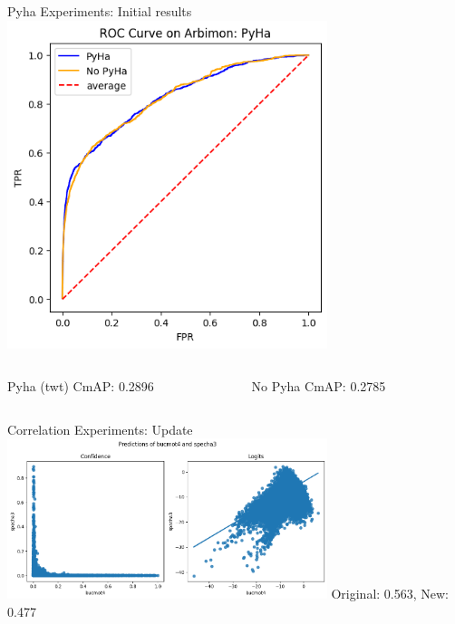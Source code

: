 \begin{frame}{Pyha Experiments: Initial results}
    \centering
    \includegraphics[height=0.7\textheight,width=0.7\textwidth,keepaspectratio]{images/arbimon_ROC.png}
    \begin{columns}
        \begin{column}{0.5\textwidth}
            Pyha (twt) CmAP: 0.2896
        \end{column}
        \begin{column}{0.5\textwidth}
            No Pyha CmAP: 0.2785
        \end{column}
    \end{columns}
\end{frame}

\begin{frame}{Correlation Experiments: Update}
    \centering
    \includegraphics[height=0.7\textheight,width=0.7\textwidth,keepaspectratio]{images/bucmot_specha.png}
    \break
    Original: 0.563, New: 0.477
\end{frame}

